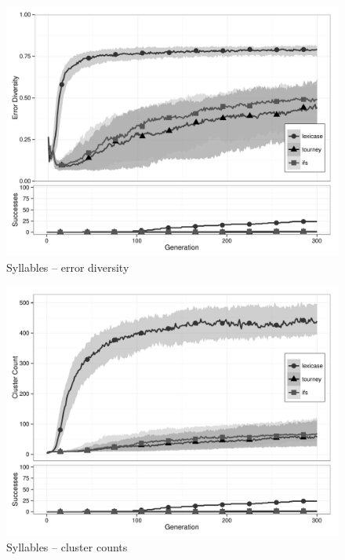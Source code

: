 \begin{figure}[p] %
\centering
\includegraphics[width=11.5cm]{syllables-diversity.pdf}
\caption{Syllables -- error diversity}
\label{syllablesDiv}
\end{figure}

\begin{figure}[p] %
\centering
\includegraphics[width=11.5cm]{syllables-cluster.pdf}
\caption{Syllables -- cluster counts}
\label{syllablesClu}
\end{figure}


